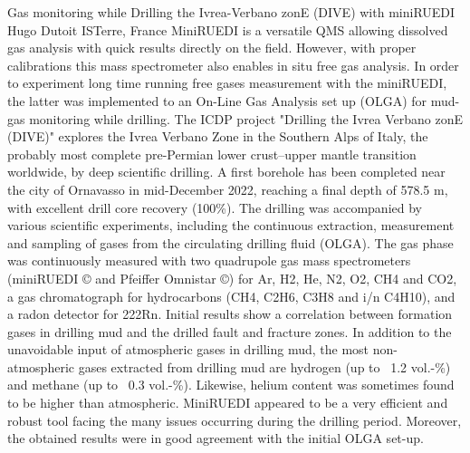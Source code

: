 \begin{conf-abstract}
{Gas monitoring while Drilling the Ivrea-Verbano zonE (DIVE) with miniRUEDI}
{Hugo Dutoit}
{ISTerre, France}
{MiniRUEDI is a versatile QMS allowing dissolved gas analysis with quick results directly on the field. However, with proper calibrations this mass spectrometer also enables in situ free gas analysis. In order to experiment long time running free gases measurement with the miniRUEDI, the latter was implemented to an On-Line Gas Analysis set up (OLGA) for mud-gas monitoring while drilling. The ICDP project "Drilling the Ivrea Verbano zonE (DIVE)" explores the Ivrea Verbano Zone in the Southern Alps of Italy, the probably most complete pre-Permian lower crust–upper mantle transition worldwide, by deep scientific drilling. A first borehole has been completed near the city of Ornavasso in mid-December 2022, reaching a final depth of 578.5 m, with excellent drill core recovery (100\%). The drilling was accompanied by various scientific experiments, including the continuous extraction, measurement and sampling of gases from the circulating drilling fluid (OLGA). The gas phase was continuously measured with two quadrupole gas mass spectrometers (miniRUEDI © and Pfeiffer Omnistar ©) for Ar, H2, He, N2, O2, CH4 and CO2, a gas chromatograph for hydrocarbons (CH4, C2H6, C3H8 and i/n C4H10), and a radon detector for 222Rn. Initial results show a correlation between formation gases in drilling mud and the drilled fault and fracture zones. In addition to the unavoidable input of atmospheric gases in drilling mud, the most non-atmospheric gases extracted from drilling mud are hydrogen (up to ~1.2 vol.-\%) and methane (up to ~0.3 vol.-\%). Likewise, helium content was sometimes found to be higher than atmospheric. MiniRUEDI appeared to be a very efficient and robust tool facing the many issues occurring during the drilling period. Moreover, the obtained results were in good agreement with the initial OLGA set-up.}
\end{conf-abstract}
